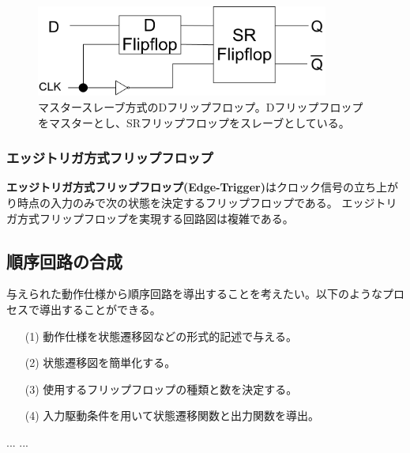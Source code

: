 \documentclass[a4j,10pt,oneside,openany,fleqn]{jsbook}
\begin{document}
\begin{figure}[h]
  \centering\includegraphics[height=3cm]{Images/DMasterSlave.png}
  \caption{マスタースレーブ方式のDフリップフロップ。Dフリップフロップをマスターとし、SRフリップフロップをスレーブとしている。}
\end{figure}

\subsubsection{エッジトリガ方式フリップフロップ}
\textbf{エッジトリガ方式フリップフロップ(Edge-Trigger)}はクロック信号の立ち上がり時点の入力のみで次の状態を決定するフリップフロップである。
エッジトリガ方式フリップフロップを実現する回路図は複雑である。

\subsection{順序回路の合成}
与えられた動作仕様から順序回路を導出することを考えたい。以下のようなプロセスで導出することができる。

\begin{enumerate}
\item[(1)]動作仕様を状態遷移図などの形式的記述で与える。
\item[(2)]状態遷移図を簡単化する。
\item[(3)]使用するフリップフロップの種類と数を決定する。
\item[(4)]入力駆動条件を用いて状態遷移関数と出力関数を導出。
  
\end{enumerate}

\begin{thebibliography}{20}
...
  ...
\end{thebibliography}

\newpage
\printindex
%
%
\end{document}
